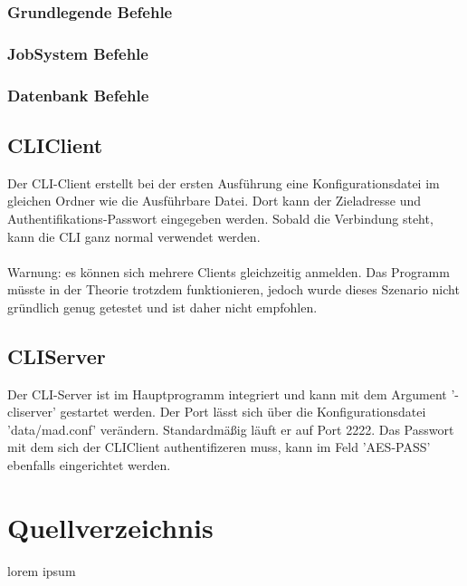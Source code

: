 \documentclass[12pt,a4paper]{report}
\begin{document}
\subsection{Grundlegende Befehle}

\subsection{JobSystem Befehle}

\subsection{Datenbank Befehle}

\section{CLIClient}

Der CLI-Client erstellt bei der ersten Ausführung eine Konfigurationsdatei im gleichen Ordner wie die Ausführbare Datei. Dort kann der Zieladresse und Authentifikations-Passwort eingegeben werden. Sobald die Verbindung steht, kann die CLI ganz normal verwendet werden.\\\\
Warnung: es können sich mehrere Clients gleichzeitig anmelden. Das Programm müsste in der Theorie trotzdem funktionieren, jedoch wurde dieses Szenario nicht gründlich genug getestet und ist daher nicht empfohlen.

\section{CLIServer}

Der CLI-Server ist im Hauptprogramm integriert und kann mit dem Argument '-cliserver' gestartet werden. Der Port lässt sich über die Konfigurationsdatei 'data/mad.conf' verändern. Standardmäßig läuft er auf Port 2222. Das Passwort mit dem sich der CLIClient authentifizeren muss, kann im Feld 'AES-PASS' ebenfalls eingerichtet werden.

\chapter{Quellverzeichnis}
lorem ipsum
\end{document}
